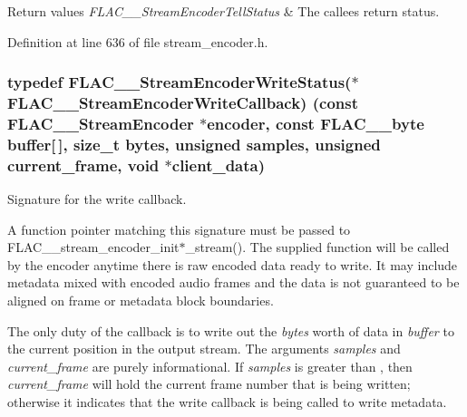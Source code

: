 \begin{DoxyRetVals}{Return values}
{\em F\+L\+A\+C\+\_\+\+\_\+\+Stream\+Encoder\+Tell\+Status} & The callee\textquotesingle{}s return status. \\
\hline
\end{DoxyRetVals}


Definition at line 636 of file stream\+\_\+encoder.\+h.

\subsubsection[{\texorpdfstring{F\+L\+A\+C\+\_\+\+\_\+\+Stream\+Encoder\+Write\+Callback}{FLAC__StreamEncoderWriteCallback}}]{\setlength{\rightskip}{0pt plus 5cm}typedef {\bf F\+L\+A\+C\+\_\+\+\_\+\+Stream\+Encoder\+Write\+Status}($\ast$ F\+L\+A\+C\+\_\+\+\_\+\+Stream\+Encoder\+Write\+Callback) ({\bf const} {\bf F\+L\+A\+C\+\_\+\+\_\+\+Stream\+Encoder} $\ast$encoder, {\bf const} {\bf F\+L\+A\+C\+\_\+\+\_\+byte} {\bf buffer}\mbox{[}$\,$\mbox{]}, size\+\_\+t bytes, unsigned {\bf samples}, unsigned current\+\_\+frame, {\bf void} $\ast$client\+\_\+data)}\hypertarget{group__flac__stream__encoder_ga50865125fd57c40fab6eb2f062651429}{}\label{group__flac__stream__encoder_ga50865125fd57c40fab6eb2f062651429}
Signature for the write callback.

A function pointer matching this signature must be passed to F\+L\+A\+C\+\_\+\+\_\+stream\+\_\+encoder\+\_\+init$\ast$\+\_\+stream(). The supplied function will be called by the encoder anytime there is raw encoded data ready to write. It may include metadata mixed with encoded audio frames and the data is not guaranteed to be aligned on frame or metadata block boundaries.

The only duty of the callback is to write out the {\itshape bytes} worth of data in {\itshape buffer} to the current position in the output stream. The arguments {\itshape samples} and {\itshape current\+\_\+frame} are purely informational. If {\itshape samples} is greater than {}, then {\itshape current\+\_\+frame} will hold the current frame number that is being written; otherwise it indicates that the write callback is being called to write metadata.

